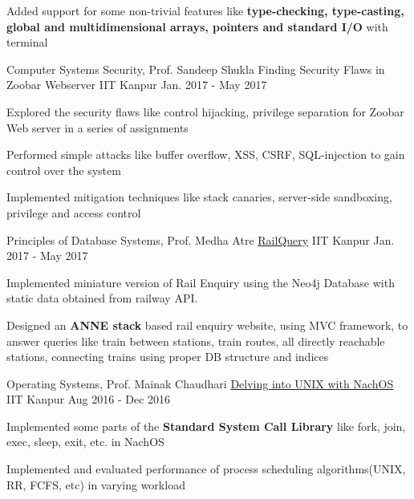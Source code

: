 \begin{cventries}
{\begin{cvitems}
        \item {Added support for some non-trivial features like \textbf{type-checking, type-casting, global and multidimensional arrays, pointers and standard I/O} with terminal}
      \end{cvitems}
    }
  \cventry
    {Computer Systems Security, Prof. Sandeep Shukla}
    {Finding Security Flaws in Zoobar Webserver}
    {IIT Kanpur}
    {Jan. 2017 - May 2017}
    {
      \begin{cvitems}
        \item {Explored the security flaws like control hijacking, privilege separation for Zoobar Web server in a series of assignments}
        \item {Performed simple attacks like buffer overflow, XSS, CSRF, SQL-injection to gain control over the system}
        \item {Implemented mitigation techniques like stack canaries, server-side sandboxing, privilege and access control}
      \end{cvitems}
    }
  \cventry
    {Principles of Database Systems, Prof. Medha Atre}
    {\href{https://github.com/tulsyan/railquery}{RailQuery}}
    {IIT Kanpur}
    {Jan. 2017 - May 2017}
    {
      \begin{cvitems}
        \item {Implemented miniature version of Rail Enquiry using the Neo4j Database with static data obtained from railway API.}
        \item {Designed an \textbf{ANNE stack} based rail enquiry website, using MVC framework, to answer queries like train between stations, train routes, all directly reachable stations, connecting trains using proper DB structure and indices}
      \end{cvitems}
    }
  \cventry
    {Operating Systems, Prof. Mainak Chaudhari}
    {\href{https://bitbucket.org/arhamchopra11/nachos-assignments}{Delving into UNIX with NachOS}}
    {IIT Kanpur}
    {Aug 2016 - Dec 2016}
    {
      \begin{cvitems}
        \item {Implemented some parts of the \textbf{Standard System Call Library} like fork, join, exec, sleep, exit, etc. in NachOS}
        \item {Implemented and evaluated performance of process scheduling algorithms(UNIX, RR, FCFS, etc) in varying workload}

\end{cvitems}}
\end{cventries}
